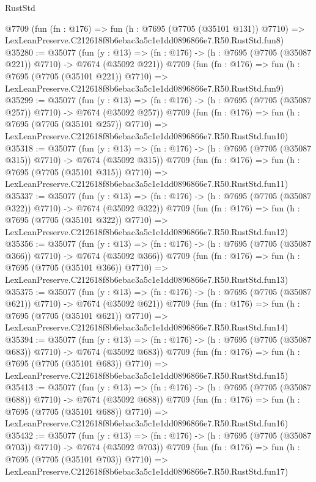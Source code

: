 \begin{lexlean}{RustStd}
\begin{coremodule}
    @7709
    (fun (fn : @176) =>
    fun (h : @7695 (@7705 (@35101 @131)) @7710) =>
    LexLeanPreserve.C212618f8b6ebac3a5c1e1dd0896866e7.R50.RustStd.fun8)
@35280 := @35077
    (fun (y : @13) => (fn : @176) -> (h : @7695 (@7705 (@35087 @221)) @7710) -> @7674 (@35092 @221))
    @7709
    (fun (fn : @176) =>
    fun (h : @7695 (@7705 (@35101 @221)) @7710) =>
    LexLeanPreserve.C212618f8b6ebac3a5c1e1dd0896866e7.R50.RustStd.fun9)
@35299 := @35077
    (fun (y : @13) => (fn : @176) -> (h : @7695 (@7705 (@35087 @257)) @7710) -> @7674 (@35092 @257))
    @7709
    (fun (fn : @176) =>
    fun (h : @7695 (@7705 (@35101 @257)) @7710) =>
    LexLeanPreserve.C212618f8b6ebac3a5c1e1dd0896866e7.R50.RustStd.fun10)
@35318 := @35077
    (fun (y : @13) => (fn : @176) -> (h : @7695 (@7705 (@35087 @315)) @7710) -> @7674 (@35092 @315))
    @7709
    (fun (fn : @176) =>
    fun (h : @7695 (@7705 (@35101 @315)) @7710) =>
    LexLeanPreserve.C212618f8b6ebac3a5c1e1dd0896866e7.R50.RustStd.fun11)
@35337 := @35077
    (fun (y : @13) => (fn : @176) -> (h : @7695 (@7705 (@35087 @322)) @7710) -> @7674 (@35092 @322))
    @7709
    (fun (fn : @176) =>
    fun (h : @7695 (@7705 (@35101 @322)) @7710) =>
    LexLeanPreserve.C212618f8b6ebac3a5c1e1dd0896866e7.R50.RustStd.fun12)
@35356 := @35077
    (fun (y : @13) => (fn : @176) -> (h : @7695 (@7705 (@35087 @366)) @7710) -> @7674 (@35092 @366))
    @7709
    (fun (fn : @176) =>
    fun (h : @7695 (@7705 (@35101 @366)) @7710) =>
    LexLeanPreserve.C212618f8b6ebac3a5c1e1dd0896866e7.R50.RustStd.fun13)
@35375 := @35077
    (fun (y : @13) => (fn : @176) -> (h : @7695 (@7705 (@35087 @621)) @7710) -> @7674 (@35092 @621))
    @7709
    (fun (fn : @176) =>
    fun (h : @7695 (@7705 (@35101 @621)) @7710) =>
    LexLeanPreserve.C212618f8b6ebac3a5c1e1dd0896866e7.R50.RustStd.fun14)
@35394 := @35077
    (fun (y : @13) => (fn : @176) -> (h : @7695 (@7705 (@35087 @683)) @7710) -> @7674 (@35092 @683))
    @7709
    (fun (fn : @176) =>
    fun (h : @7695 (@7705 (@35101 @683)) @7710) =>
    LexLeanPreserve.C212618f8b6ebac3a5c1e1dd0896866e7.R50.RustStd.fun15)
@35413 := @35077
    (fun (y : @13) => (fn : @176) -> (h : @7695 (@7705 (@35087 @688)) @7710) -> @7674 (@35092 @688))
    @7709
    (fun (fn : @176) =>
    fun (h : @7695 (@7705 (@35101 @688)) @7710) =>
    LexLeanPreserve.C212618f8b6ebac3a5c1e1dd0896866e7.R50.RustStd.fun16)
@35432 := @35077
    (fun (y : @13) => (fn : @176) -> (h : @7695 (@7705 (@35087 @703)) @7710) -> @7674 (@35092 @703))
    @7709
    (fun (fn : @176) =>
    fun (h : @7695 (@7705 (@35101 @703)) @7710) =>
    LexLeanPreserve.C212618f8b6ebac3a5c1e1dd0896866e7.R50.RustStd.fun17)

\end{coremodule}
\end{lexlean}
